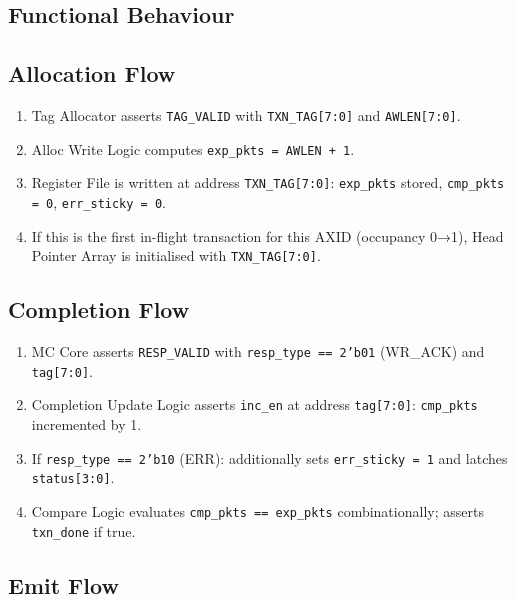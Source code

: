 \subsection{Functional Behaviour}

\subsection{Allocation Flow}

\begin{enumerate}
  \item Tag Allocator asserts \texttt{TAG\_VALID} with
        \texttt{TXN\_TAG[7:0]} and \texttt{AWLEN[7:0]}.
  \item Alloc Write Logic computes \texttt{exp\_pkts = AWLEN + 1}.
  \item Register File is written at address \texttt{TXN\_TAG[7:0]}:
        \texttt{exp\_pkts} stored, \texttt{cmp\_pkts = 0},
        \texttt{err\_sticky = 0}.
  \item If this is the first in-flight transaction for this AXID
        (occupancy 0→1), Head Pointer Array is initialised with
        \texttt{TXN\_TAG[7:0]}.
\end{enumerate}

\subsection{Completion Flow}

\begin{enumerate}
  \item MC Core asserts \texttt{RESP\_VALID} with
        \texttt{resp\_type == 2'b01} (WR\_ACK) and \texttt{tag[7:0]}.
  \item Completion Update Logic asserts \texttt{inc\_en} at address
        \texttt{tag[7:0]}: \texttt{cmp\_pkts} incremented by 1.
  \item If \texttt{resp\_type == 2'b10} (ERR): additionally sets
        \texttt{err\_sticky = 1} and latches \texttt{status[3:0]}.
  \item Compare Logic evaluates \texttt{cmp\_pkts == exp\_pkts}
        combinationally; asserts \texttt{txn\_done} if true.
\end{enumerate}

\subsection{Emit Flow}

